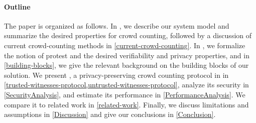 
\paragraph{Outline}

The paper is organized as follows.
In , we describe our system model and summarize the desired 
properties for crowd counting, followed by a discussion of current 
crowd-counting methods in \cref{current-crowd-counting}. In , 
we formalize the notion of protest and the desired verifiability and privacy 
properties, and in \cref{building-blocks}, we give the relevant background on 
the building blocks of our solution.
%
%
We present \CROCUS, a privacy-preserving crowd counting 
protocol in in \cref{trusted-witnesses-protocol,untrusted-witnesses-protocol}, 
analyze its security in \cref{SecurityAnalysis}, and estimate its performance 
in \cref{PerformanceAnalysis}.
We compare it to related work in \cref{related-work}.
Finally, we discuss limitations and assumptions in \cref{Discussion} and give 
our conclusions in \cref{Conclusion}.
